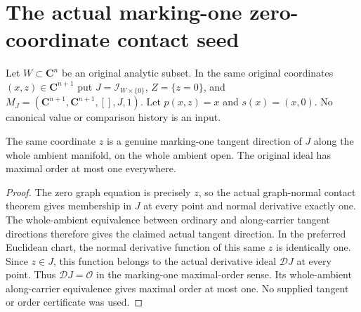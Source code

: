 \section{The actual marking-one zero-coordinate contact seed}

Let $W\subset\mathbf C^n$ be an original analytic subset. In the same
original coordinates $(x,z)\in\mathbf C^{n+1}$ put
$J=\mathcal I_{W\times\{0\}}$, $Z=\{z=0\}$, and
$M_J=(\mathbf C^{n+1},\mathbf C^{n+1},[],J,1)$. Let $p(x,z)=x$
and $s(x)=(x,0)$. No canonical value or comparison history is an input.

\begin{lemma}
\label{hir:actual-zero-coordinate-genuine-contact-seed}
\leanok
The same coordinate $z$ is a genuine marking-one tangent direction
of $J$ along the whole ambient manifold, on the whole ambient open.
The original ideal has maximal order at most one everywhere.
\end{lemma}
\begin{proof}
The zero graph equation is precisely $z$, so the actual graph-normal
contact theorem gives membership in $J$ at every point and normal
derivative exactly one. The whole-ambient equivalence between ordinary
and along-carrier tangent directions therefore gives the claimed
actual tangent direction. In the preferred Euclidean chart, the
normal derivative function of this same $z$ is identically one.
Since $z\in J$, this function belongs to the actual derivative ideal
$\mathcal D J$ at every point. Thus $\mathcal D J=\mathcal O$ in the
marking-one maximal-order sense. Its whole-ambient along-carrier
equivalence gives maximal order at most one. No supplied tangent or
order certificate was used.
\end{proof}

